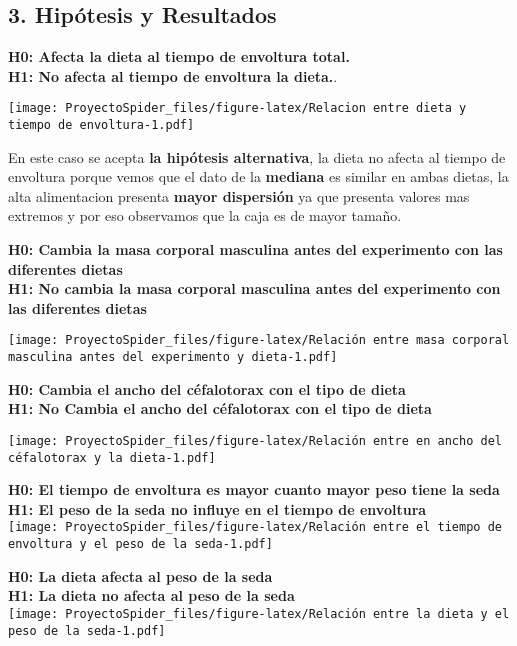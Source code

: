 \documentclass[
]{article}
\begin{document}
\subsection{3. Hipótesis y Resultados}\label{hipuxf3tesis-y-resultados}

\textbf{H0: Afecta la dieta al tiempo de envoltura total.}\\
\textbf{H1: No afecta al tiempo de envoltura la dieta.}.

\texttt{[image: ProyectoSpider\_files/figure-latex/Relacion entre dieta y tiempo de envoltura-1.pdf]}

En este caso se acepta \textbf{la hipótesis alternativa}, la dieta no
afecta al tiempo de envoltura porque vemos que el dato de la
\textbf{mediana} es similar en ambas dietas, la alta alimentacion
presenta \textbf{mayor dispersión} ya que presenta valores mas extremos
y por eso observamos que la caja es de mayor tamaño.

\newpage

\textbf{H0: Cambia la masa corporal masculina antes del experimento con
las diferentes dietas}\\
\textbf{H1: No cambia la masa corporal masculina antes del experimento
con las diferentes dietas}

\texttt{[image: ProyectoSpider\_files/figure-latex/Relación entre masa corporal masculina antes del experimento y dieta-1.pdf]}

\textbf{H0: Cambia el ancho del céfalotorax con el tipo de dieta}\\
\textbf{H1: No Cambia el ancho del céfalotorax con el tipo de dieta}

\texttt{[image: ProyectoSpider\_files/figure-latex/Relación entre en ancho del céfalotorax y la dieta-1.pdf]}

\textbf{H0: El tiempo de envoltura es mayor cuanto mayor peso tiene la
seda}\\
\textbf{H1: El peso de la seda no influye en el tiempo de envoltura}\\
\texttt{[image: ProyectoSpider\_files/figure-latex/Relación entre el tiempo de envoltura y el peso de la seda-1.pdf]}

\textbf{H0: La dieta afecta al peso de la seda}\\
\textbf{H1: La dieta no afecta al peso de la seda}\\
\texttt{[image: ProyectoSpider\_files/figure-latex/Relación entre la dieta y el peso de la seda-1.pdf]}
\end{document}
